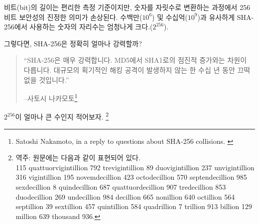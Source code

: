 \begin{comment}
	While bit length is a convenient metric, the true meaning of 256-bit
	security is lost in translation. Similar to the millions ($10^6$) and
	billions ($10^9$) above, the number in SHA-256 is about orders of magnitude
	($2^{256}$).
\end{comment}
비트(bit)의 길이는 편리한 측정 기준이지만, 숫자를 자릿수로 변환하는 과정에서 256비트 보안성의 진정한 의미가 손상된다.
수백만($10^6$) 및 수십억($10^9$)과 유사하게 SHA-256에서 사용하는 숫자의 자리수는 엄청나게 크다.($2^{256}$).
\begin{comment}
	So, how strong is SHA-256, exactly?
\end{comment}
그렇다면, SHA-256은 정확히 얼마나 강력할까?

\begin{comment}
	\begin{quotation}\begin{samepage}
			\enquote{SHA-256 is very strong. It's not like the incremental step from MD5
				to SHA1. It can last several decades unless there's some massive
				breakthrough attack.}
			\begin{flushright} -- Satoshi Nakamoto\footnote{Satoshi Nakamoto, in a reply to questions about SHA-256 collisions. \cite{satoshi-sha256}}
	\end{flushright}\end{samepage}\end{quotation}
\end{comment}
\begin{quotation}\begin{samepage}
		\enquote{SHA-256은 매우 강력합니다. MD5에서 SHA1로의 점진적 증가와는 차원이 다릅니다.
			대규모의 획기적인 해킹 공격이 발생하지 않는 한 수십 년 동안 끄떡없을 것입니다.}
		\begin{flushright} --사토시 나카모토\footnote{Satoshi Nakamoto, in a reply to questions about SHA-256 collisions. \cite{satoshi-sha256}}
\end{flushright}\end{samepage}\end{quotation}

$2^{256}$이 얼마나 큰 수인지 적어보자.
\footnote{
	역주: 원문에는 다음과 같이 표현되어 있다. \\
	115 quattuorvigintillion 792 trevigintillion 89 duovigintillion 237
	unvigintillion 316 vigintillion 195 novemdecillion 423 octodecillion 570
	septendecillion 985 sexdecillion 8 quindecillion 687 quattuordecillion 907
	tredecillion 853 duodecillion 269 undecillion 984 decillion 665 nonillion
	640 octillion 564 septillion 39 sextillion 457 quintillion 584 quadrillion 7
	trillion 913 billion 129 million 639 thousand 936.}


